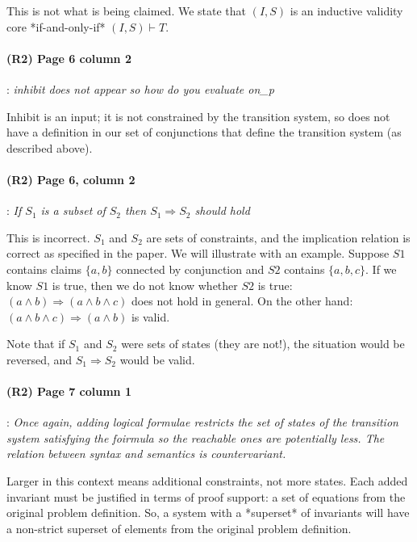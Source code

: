 \documentclass{article}
\begin{document}
\noindent This is not what is being claimed. We state that $(I, S)$ is an
inductive validity core *if-and-only-if* $(I, S) \vdash T$.

\paragraph{(R2) Page 6 column 2}: \textit{inhibit does not appear so how do you evaluate
on\_p}
\vspace{0.05in}

\noindent Inhibit is an input; it is not constrained by the transition
system, so does not have a definition in our set of conjunctions
that define the transition system (as described above).

\newcommand{\implies}[0]{\Rightarrow}
\newcommand{\mkeyword}[1]{\mbox{\texttt{#1}}}

\paragraph{(R2) Page 6, column 2}: \textit{If $S_1$ is a subset of $S_2$ then $S_1 \implies S_2$ should hold}
\vspace{0.05in}

\noindent This is incorrect. $S_1$ and $S_2$ are sets of constraints, and the implication relation is correct as specified in the paper.  We will illustrate with an example. Suppose $S1$ contains claims $\{a, b\}$ connected by conjunction and $S2$ contains $\{a,
b, c\}$.  If we know $S1$ is true, then we do not know whether $S2$ is true: $(a \land
b) \implies (a \land b \land c)$ does not hold in general.  On the other hand: $(a \land b \land c) \implies (a \land b)$ is valid.

Note that if $S_1$ and $S_2$ were sets of states (they are not!), the situation would be reversed, and $S_1 \implies S_2$ would be valid.


\paragraph{(R2) Page 7 column 1}:
\textit{Once again, adding logical formulae restricts the set of states of the transition system satisfying the foirmula so
the reachable ones are potentially less. The relation between syntax and
semantics is countervariant.}
\vspace{0.05in}

\noindent Larger in this context means additional constraints, not more states.  Each added invariant must be justified in terms of proof support: a set of equations from the original problem definition. So, a system with a *superset* of invariants will have a non-strict superset of elements from the original problem definition.
\end{document}
